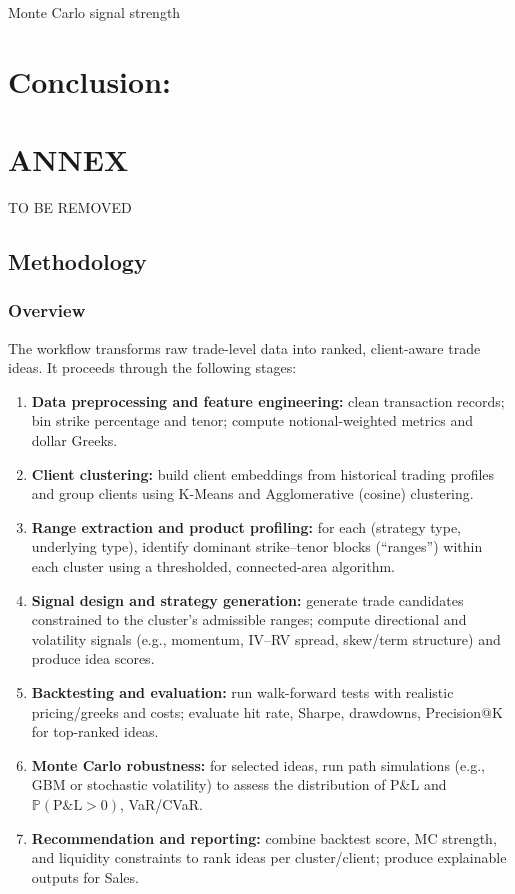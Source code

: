 \documentclass[12pt,a4paper]{report}
\begin{document}
Monte Carlo signal strength


\chapter{Conclusion:}





\chapter{ANNEX}
 

 TO BE REMOVED 

\section{Methodology}

\subsection{Overview}
The workflow transforms raw trade-level data into ranked, client-aware trade ideas. It proceeds through the following stages:
\begin{enumerate}
    \item \textbf{Data preprocessing and feature engineering:} clean transaction records; bin strike percentage and tenor; compute notional-weighted metrics and dollar Greeks.
    \item \textbf{Client clustering:} build client embeddings from historical trading profiles and group clients using K-Means and Agglomerative (cosine) clustering.
    \item \textbf{Range extraction and product profiling:} for each (strategy type, underlying type), identify dominant strike--tenor blocks (``ranges'') within each cluster using a thresholded, connected-area algorithm.
    \item \textbf{Signal design and strategy generation:} generate trade candidates constrained to the cluster's admissible ranges; compute directional and volatility signals (e.g., momentum, IV--RV spread, skew/term structure) and produce idea scores.
    \item \textbf{Backtesting and evaluation:} run walk-forward tests with realistic pricing/greeks and costs; evaluate hit rate, Sharpe, drawdowns, Precision@K for top-ranked ideas.
    \item \textbf{Monte Carlo robustness:} for selected ideas, run path simulations (e.g., GBM or stochastic volatility) to assess the distribution of P\&L and \(\mathbb{P}(\text{P\&L}>0)\), VaR/CVaR.
    \item \textbf{Recommendation and reporting:} combine backtest score, MC strength, and liquidity constraints to rank ideas per cluster/client; produce explainable outputs for Sales.
\end{enumerate}
\end{document}
